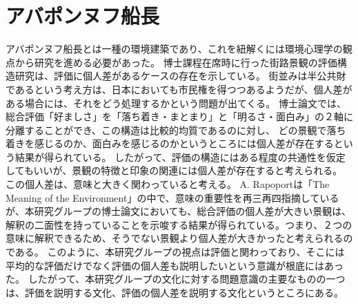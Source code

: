 \section{アバポンヌフ船長}
アバポンヌフ船長とは一種の環境建築であり、これを紐解くには環境心理学の観点から研究を進める必要があった。
博士課程在席時に行った街路景観の評価構造研究は、評価に個人差があるケースの存在を示している。
街並みは半公共財であるという考え方は、日本においても市民権を得つつあるようだが、個人差がある場合には、それをどう処理するかという問題が出てくる。
博士論文では、総合評価「好ましさ」を「落ち着き・まとまり」と「明るさ・面白み」の２軸に分離することができ、この構造は比較的均質であるのに対し、
どの景観で落ち着きを感じるのか、面白みを感じるのかというところには個人差が存在するという結果が得られている。
したがって、評価の構造にはある程度の共通性を仮定してもいいが、景観の特徴と印象の関連には個人差が存在すると考えられる。
この個人差は、意味と大きく関わっていると考える。
A. Rapoportは「The Meaning of the Environment」の中で、意味の重要性を再三再四指摘しているが、本研究グループの博士論文においても、総合評価の個人差が大きい景観は、解釈の二面性を持っていることを示唆する結果が得られている。つまり、２つの意味に解釈できるため、そうでない景観より個人差が大きかったと考えられるのである。
このように、本研究グループの視点は評価と関わっており、そこには平均的な評価だけでなく評価の個人差も説明したいという意識が根底にはあった。
したがって、本研究グループの文化に対する問題意識の主要なものの一つは、評価を説明する文化、評価の個人差を説明する文化というところにある。

